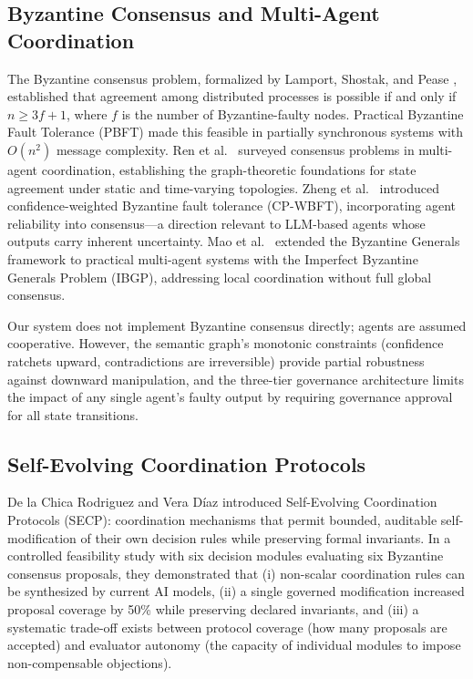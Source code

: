 \documentclass[11pt]{article}
\begin{document}
\subsection{Byzantine Consensus and Multi-Agent Coordination}

The Byzantine consensus problem, formalized by Lamport, Shostak, and Pease \cite{lamport1982}, established that agreement among distributed processes is possible if and only if $n \geq 3f + 1$, where $f$ is the number of Byzantine-faulty nodes. Practical Byzantine Fault Tolerance (PBFT) \cite{castro1999} made this feasible in partially synchronous systems with $O(n^2)$ message complexity. Ren et al.\ \cite{ren2005} surveyed consensus problems in multi-agent coordination, establishing the graph-theoretic foundations for state agreement under static and time-varying topologies. Zheng et al.\ \cite{zheng2025} introduced confidence-weighted Byzantine fault tolerance (CP-WBFT), incorporating agent reliability into consensus---a direction relevant to LLM-based agents whose outputs carry inherent uncertainty. Mao et al.\ \cite{mao2024} extended the Byzantine Generals framework to practical multi-agent systems with the Imperfect Byzantine Generals Problem (IBGP), addressing local coordination without full global consensus.

Our system does not implement Byzantine consensus directly; agents are assumed cooperative. However, the semantic graph's monotonic constraints (confidence ratchets upward, contradictions are irreversible) provide partial robustness against downward manipulation, and the three-tier governance architecture limits the impact of any single agent's faulty output by requiring governance approval for all state transitions.

\subsection{Self-Evolving Coordination Protocols}

De la Chica Rodriguez and Vera D\'{i}az \cite{delachica2026} introduced Self-Evolving Coordination Protocols (SECP): coordination mechanisms that permit bounded, auditable self-modification of their own decision rules while preserving formal invariants. In a controlled feasibility study with six decision modules evaluating six Byzantine consensus proposals, they demonstrated that (i) non-scalar coordination rules can be synthesized by current AI models, (ii) a single governed modification increased proposal coverage by 50\% while preserving declared invariants, and (iii) a systematic trade-off exists between protocol coverage (how many proposals are accepted) and evaluator autonomy (the capacity of individual modules to impose non-compensable objections).
\end{document}
